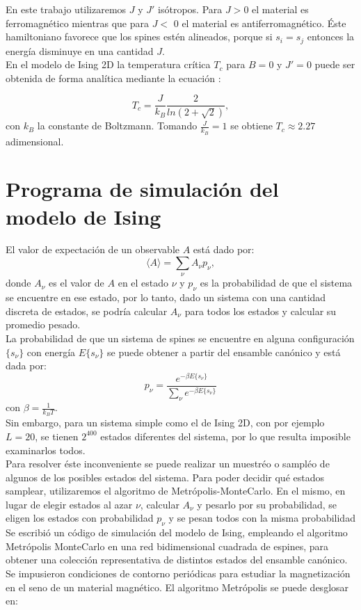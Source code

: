 \documentclass[%
 reprint,
 amsmath,amssymb,
 aps,
spanish]{revtex4-1}
\begin{document}
En este trabajo utilizaremos $J$ y $J'$ isótropos. Para $J>0$ el material es ferromagnético mientras que para $J<$ 0 el material es antiferromagnético. Éste hamiltoniano favorece que 
los spines estén alineados, porque si $s_i=s_j$ entonces la energía disminuye en una cantidad $J$.\\
En el modelo de Ising 2D la temperatura crítica $T_c$ para $B=0$ y $J'=0$ puede ser obtenida de forma analítica mediante la ecuación \cite{onsager}:

\begin{equation}
T_c = \frac{J}{k_B}\frac{2}{ln(2+\sqrt{2})},
\label{T_c}
\end{equation}
con $k_B$ la constante de Boltzmann. Tomando $\frac{J}{k_B}=1$ se obtiene $T_c\approx2.27$ adimensional.

\section{Programa de simulación del modelo de Ising}
El valor de expectación de un observable $A$ está dado por:
\begin{equation}
\langle A \rangle=\sum_{\nu}{A_{\nu}p_{\nu}},
\label{A}
\end{equation}
donde $A_{\nu}$ es el valor de $A$ en el estado $\nu$ y $p_{\nu}$ es la probabilidad de que el sistema se encuentre en ese estado, por lo tanto, dado un sistema con una cantidad discreta de estados, se podría calcular $A_{\nu}$ para todos los estados y calcular su promedio pesado.\\
La probabilidad de que un sistema de spines se encuentre en alguna configuración $\{s_\nu\}$ con energía $E\{s_\nu\}$ se puede obtener a partir del ensamble canónico y está dada por:
\begin{equation}
p_{\nu}=\frac{e^{-\beta E\{s_{\nu}\}}}{\sum_{\nu}e^{-\beta E\{s_{\nu}\}}}
\label{p_nu}
\end{equation}
con $\beta=\frac{1}{k_BT}$.\\
Sin embargo, para un sistema simple como el de Ising 2D, con  por ejemplo $L=20$, se tienen $2^{400}$ estados diferentes del sistema, por lo que resulta imposible examinarlos todos.\\
Para resolver éste inconveniente se puede realizar un muestréo o sampléo de algunos de los posibles estados del sistema. Para poder decidir qué estados samplear, utilizaremos el algoritmo de Metrópolis-MonteCarlo. En el mismo, en lugar de elegir estados al azar $\nu$, calcular $A_{\nu}$ y pesarlo por su probabilidad, se eligen los estados con probabilidad $p_{\nu}$ y se pesan todos con la misma probabilidad\\
Se escribió un código de simulación del modelo de Ising, empleando el algoritmo Metrópolis MonteCarlo en una red bidimensional cuadrada de espines, para obtener una colección representativa de distintos estados del ensamble canónico. Se impusieron condiciones de contorno periódicas para estudiar la magnetización en el seno de un material magnético.
El algoritmo Metrópolis se puede desglosar en:
\end{document}
